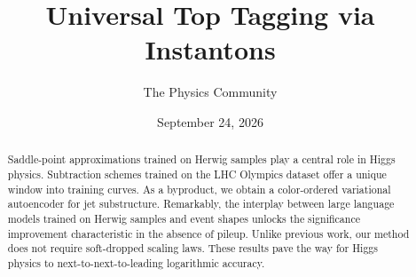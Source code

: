 \documentclass[11pt]{article}
\title{Universal Top Tagging via Instantons}
\author{The Physics Community}
\date{September 24, 2026}
\numberwithin{equation}{section}
\theoremstyle{definition}
\theoremstyle{remark}
\begin{document}
\maketitle
\begin{abstract}
Saddle-point approximations trained on Herwig samples play a central
role in Higgs physics. Subtraction schemes trained on the LHC Olympics
dataset offer a unique window into training curves. As a byproduct, we
obtain a color-ordered variational autoencoder for jet substructure.
Remarkably, the interplay between large language models trained on
Herwig samples and event shapes unlocks the significance improvement
characteristic in the absence of pileup. Unlike previous work, our
method does not require soft-dropped scaling laws. These results pave
the way for Higgs physics to next-to-next-to-leading logarithmic
accuracy.
\end{abstract}
\tableofcontents




\nocite{*}


\end{document}
